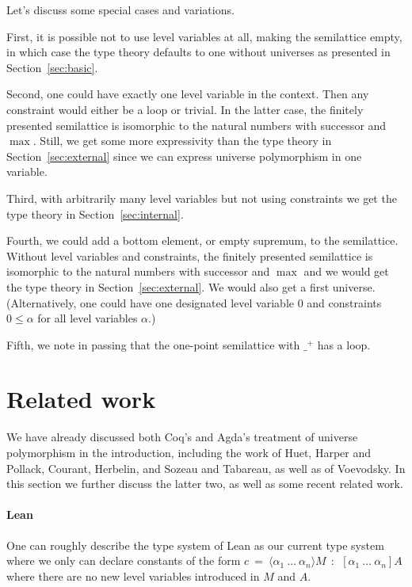 \documentclass[a4paper,UKenglish,cleveref, autoref, thm-restate]{lipics-v2021}
\newcommand{\lam}[1]{{\langle}#1{\rangle}}
\begin{document}
\begin{remark}
Let's discuss some special cases and variations.

First, it is possible not to use
level variables at all, making the semilattice empty,
in which case the type theory defaults to one without universes
as presented in Section~\ref{sec:basic}.

Second, one could have exactly one level variable in the context.
Then any constraint would either be a loop or trivial.
In the latter case, the finitely presented semilattice
is isomorphic to the natural numbers with successor and $\max$.
Still, we get some more
expressivity than the type theory in Section~\ref{sec:external} since
we can express universe polymorphism in one variable.

Third, with arbitrarily many level variables but not using constraints
we get the type theory in Section~\ref{sec:internal}.

Fourth, we could add a bottom element, or empty supremum, to the semilattice.
Without level variables and constraints, the finitely presented semilattice
is isomorphic to the natural numbers with successor and $\max$
and we would get the type theory in Section~\ref{sec:external}.
We would also get a first universe.
(Alternatively, one could have one designated level variable
$0$ and constraints $0\leqslant\alpha$
for all level variables $\alpha$.)

Fifth, we note in passing that the one-point semilattice
with $\_^+$ has a loop.
\end{remark}

\section{Related work}\label{sec:related}

We have already discussed both Coq's and Agda's treatment of universe polymorphism in the introduction, including the work of Huet, Harper and Pollack, Courant, Herbelin, and Sozeau and Tabareau, as well as of Voevodsky. In this section we further
discuss the latter two, as well as some recent related work.

\paragraph*{Lean}

One can roughly describe the type system of Lean \cite{moura:lean,Carneiro19} as our current type system
where we only can declare constants of the form
$c~=~\lam{\alpha_1~\dots~\alpha_n}M~~:~~[\alpha_1~\dots~\alpha_n]A$
where there are no new level variables introduced in $M$ and
$A$.
\end{document}
